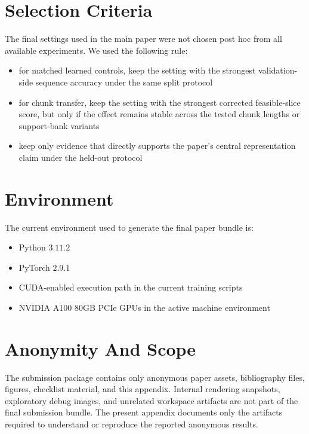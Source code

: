\documentclass[letterpaper]{article}
\begin{document}
\section{Selection Criteria}

The final settings used in the main paper were not chosen post hoc from all
available experiments. We used the following rule:
\begin{itemize}
    \item for matched learned controls, keep the setting with the strongest
    validation-side sequence accuracy under the same split protocol
    \item for chunk transfer, keep the setting with the strongest corrected
    feasible-slice score, but only if the effect remains stable across the
    tested chunk lengths or support-bank variants
    \item keep only evidence that directly supports the paper's central
    representation claim under the held-out protocol
\end{itemize}

\section{Environment}

The current environment used to generate the final paper bundle is:
\begin{itemize}
    \item Python $3.11.2$
    \item PyTorch $2.9.1$
    \item CUDA-enabled execution path in the current training scripts
    \item NVIDIA A100 80GB PCIe GPUs in the active machine environment
\end{itemize}

\section{Anonymity And Scope}

The submission package contains only anonymous paper assets, bibliography
files, figures, checklist material, and this appendix. Internal rendering
snapshots, exploratory debug images, and unrelated workspace artifacts are not
part of the final submission bundle. The present appendix documents only the
artifacts required to understand or reproduce the reported anonymous results.
\end{document}
